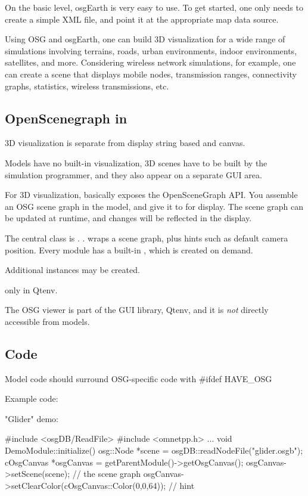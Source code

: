 On the basic level, osgEarth is very easy to use. To get started, one only
needs to create a simple XML file, and point it at the appropriate map data
source.

Using OSG and osgEarth, one can build 3D visualization for a wide range of
simulations involving terrains, roads, urban environments, indoor
environments, satellites, and more. Considering wireless network
simulations, for example, one can create a scene that displays mobile nodes,
transmission ranges, connectivity graphs, statistics, wireless transmissions, etc.

\subsection{OpenScenegraph in {\opp}}

3D visualization is separate from display string based and canvas.

Models have no built-in visualization, 3D scenes have to
be built by the simulation programmer, and they also appear on a separate
GUI area.

For 3D visualization, {\opp} basically exposes the OpenSceneGraph API.
You assemble an OSG scene graph in the model, and give it to {\opp} for
display. The scene graph can be updated at runtime, and changes will be
reflected in the display.

The central {\opp} class is . .
wraps a scene graph, plus hints such as default camera position.
Every module has a built-in , which is created on demand.

Additional  instances may be created.

only in Qtenv.

\begin{note}
The OSG viewer is part of the GUI library, Qtenv, and it is \textit{not}
directly accessible from models.
\end{note}

\subsection{Code}

Model code should surround OSG-specific code with \#ifdef HAVE\_OSG

Example code:

"Glider" demo:

\begin{cpp}
#include <osgDB/ReadFile>
#include <omnetpp.h>
...
void DemoModule::initialize() {
    osg::Node *scene = osgDB::readNodeFile("glider.osgb");
    cOsgCanvas *osgCanvas = getParentModule()->getOsgCanvas();
    osgCanvas->setScene(scene); // the scene graph
    osgCanvas->setClearColor(cOsgCanvas::Color(0,0,64)); // hint
}
\end{cpp}

